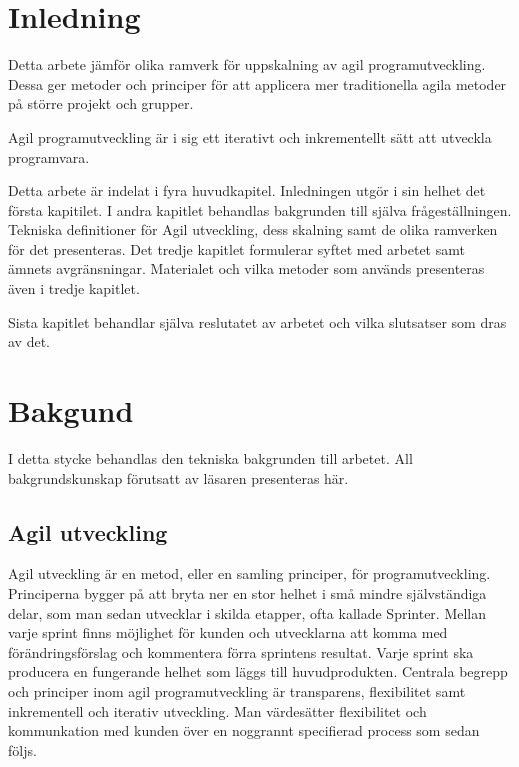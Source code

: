 \section{Inledning}
	
	Detta arbete jämför olika ramverk för uppskalning av agil programutveckling. Dessa ger metoder och principer för att applicera mer traditionella agila metoder på större projekt och grupper.
	
	Agil programutveckling är i sig ett iterativt och inkrementellt sätt att utveckla programvara.
	
	Detta arbete är indelat i fyra huvudkapitel. Inledningen utgör i sin helhet det första kapitilet.
	I andra kapitlet behandlas bakgrunden till själva frågeställningen. Tekniska definitioner för Agil utveckling, dess skalning samt de olika ramverken för det presenteras. 
	Det tredje kapitlet formulerar syftet med arbetet samt ämnets avgränsningar. Materialet och vilka metoder som används presenteras även i tredje kapitlet.
	
	Sista kapitlet behandlar själva reslutatet av arbetet och vilka slutsatser som dras av det.
	
\newpage
\section{Bakgund} 	
	
	
	I detta stycke behandlas den tekniska bakgrunden till arbetet. All bakgrundskunskap förutsatt av läsaren presenteras här.
	
	\subsection{Agil utveckling}
	
	Agil utveckling är en metod, eller en samling principer, för programutveckling. Principerna bygger på att bryta ner en stor helhet i små mindre självständiga delar, som man sedan utvecklar i skilda etapper, ofta kallade Sprinter.
	Mellan varje sprint finns möjlighet för kunden och utvecklarna att komma med förändringsförslag och kommentera förra sprintens resultat. Varje sprint ska producera en fungerande helhet som läggs till huvudprodukten. Centrala begrepp och principer inom agil programutveckling är transparens, flexibilitet samt inkrementell och iterativ utveckling. Man värdesätter flexibilitet och kommunkation med kunden över en noggrannt specifierad process som sedan följs. \cite{agile_manifesto}
	
